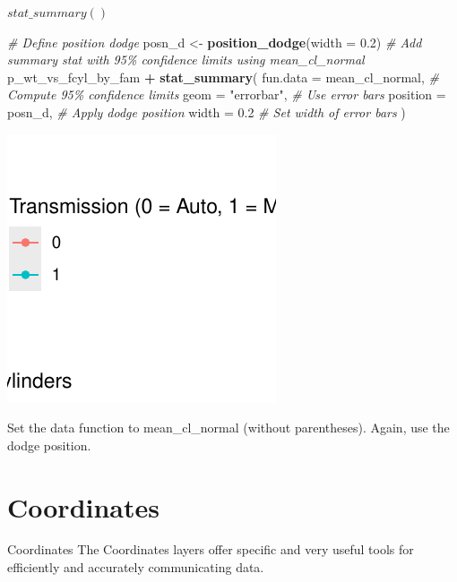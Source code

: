 \documentclass[
  ignorenonframetext,
]{beamer}
\newenvironment{Shaded}{\begin{snugshade}}{\end{snugshade}}
\newcommand{\AttributeTok}[1]{\textcolor[rgb]{0.13,0.29,0.53}{#1}}
\newcommand{\CommentTok}[1]{\textcolor[rgb]{0.56,0.35,0.01}{\textit{#1}}}
\newcommand{\FloatTok}[1]{\textcolor[rgb]{0.00,0.00,0.81}{#1}}
\newcommand{\FunctionTok}[1]{\textcolor[rgb]{0.13,0.29,0.53}{\textbf{#1}}}
\newcommand{\NormalTok}[1]{#1}
\newcommand{\OtherTok}[1]{\textcolor[rgb]{0.56,0.35,0.01}{#1}}
\newcommand{\SpecialCharTok}[1]{\textcolor[rgb]{0.81,0.36,0.00}{\textbf{#1}}}
\newcommand{\StringTok}[1]{\textcolor[rgb]{0.31,0.60,0.02}{#1}}
\begin{document}
\begin{frame}[fragile]{\(stat\_summary()\)}
\label{stat_summary-6}

\begin{Shaded}
\begin{Highlighting}[]
\CommentTok{\# Define position dodge}
\NormalTok{posn\_d }\OtherTok{\textless{}{-}} \FunctionTok{position\_dodge}\NormalTok{(}\AttributeTok{width =} \FloatTok{0.2}\NormalTok{)  }
\CommentTok{\# Add summary stat with 95\% confidence limits using mean\_cl\_normal}
\NormalTok{p\_wt\_vs\_fcyl\_by\_fam }\SpecialCharTok{+}
  \FunctionTok{stat\_summary}\NormalTok{(}
    \AttributeTok{fun.data =}\NormalTok{ mean\_cl\_normal,  }\CommentTok{\# Compute 95\% confidence limits}
    \AttributeTok{geom =} \StringTok{"errorbar"}\NormalTok{,          }\CommentTok{\# Use error bars}
    \AttributeTok{position =}\NormalTok{ posn\_d,          }\CommentTok{\# Apply dodge position}
    \AttributeTok{width =} \FloatTok{0.2}                 \CommentTok{\# Set width of error bars}
\NormalTok{  )}
\end{Highlighting}
\end{Shaded}

\begin{center}\includegraphics[width=0.5\linewidth]{Figs/unnamed-chunk-36-1} \end{center}

Set the data function to mean\_cl\_normal (without parentheses). Again,
use the dodge position.
\end{frame}

\section{Coordinates}\label{coordinates}

\begin{frame}{Coordinates}
\label{coordinates-1}
The Coordinates layers offer specific and very useful tools for
efficiently and accurately communicating data.
\end{frame}
\end{document}
